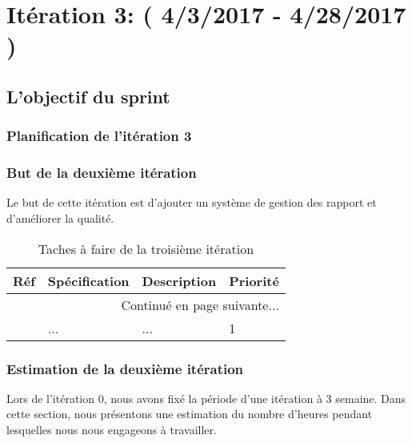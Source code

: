 \section{Itération 3: ( 4/3/2017 - 4/28/2017 )}

\subsection{L'objectif du sprint}

\subsubsection{Planification de l'itération 3}

\subsubsection{But de la deuxième itération}

Le but de cette itération est d'ajouter un système de gestion des rapport et d'améliorer
la qualité.

\begin{center}
    \footnotesize
    \begin{longtable}{| p{1cm} | p{5cm} | p{7cm} | p{1cm} |}
        \caption{Taches à faire de la troisième itération}
        \label{tab:sprint3-backlog} \\

 \hline
 \multicolumn{1}{|c}{\textbf{Réf}} &
 \multicolumn{1}{|c}{\textbf{Spécification}} &
 \multicolumn{1}{|c}{\textbf{Description}} &
 \multicolumn{1}{|c|}{\textbf{Priorité}} \\ \hline
 \endhead

 \hline \multicolumn{4}{|r|}{{Continué en page suivante$\dotsc$}} \\ \hline
 \endfoot

 \hline \hline
 \endlastfoot

\hline
1 & ... & ... & 1 \\ \hline
\end{longtable}
\end{center}

\subsubsection{Estimation de la deuxième itération}

Lors de l'itération 0, nous avons fixé la période d’une itération à 3 semaine. Dans
cette section, nous présentons une estimation du nombre d’heures pendant lesquelles
nous nous engageons à travailler.

